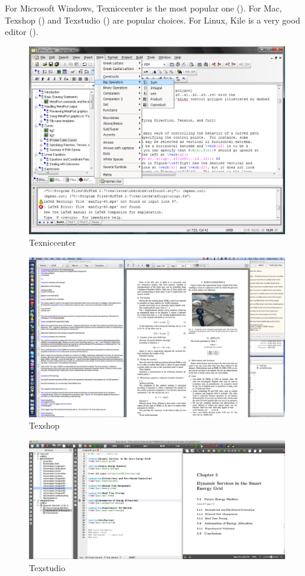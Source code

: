 For Microsoft Windows, Texniccenter is the most popular one ().
For Mac, Texshop () and Texstudio () are popular choices.
For Linux, Kile is a very good \latex editor ().

\begin{figure}
\includegraphics[height=.4\textheight]{texniccenter.png}
\caption{Texniccenter}
\label{fig:latex:texniccenter} 
\end{figure}


\begin{figure}
\includegraphics[height=.4\textheight]{texshop.png}
\caption{Texshop}
\label{fig:latex:texshop} 
\end{figure}

\begin{figure}
\includegraphics[width=\textwidth]{texstudio.jpg}
\caption{Texstudio}
\label{fig:latex:texstudio} 
\end{figure}


